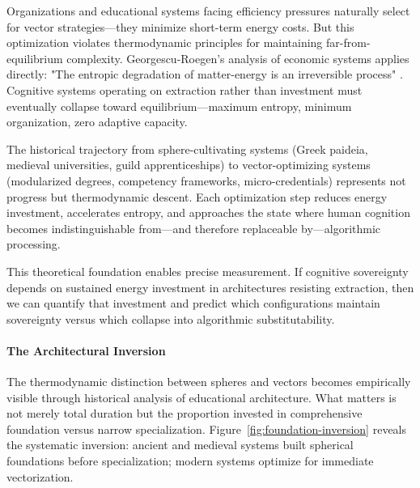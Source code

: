 Organizations and educational systems facing efficiency pressures naturally select for vector strategies—they minimize short-term energy costs. But this optimization violates thermodynamic principles for maintaining far-from-equilibrium complexity. Georgescu-Roegen's analysis of economic systems applies directly: "The entropic degradation of matter-energy is an irreversible process" \citep{georgescu1971}. Cognitive systems operating on extraction rather than investment must eventually collapse toward equilibrium—maximum entropy, minimum organization, zero adaptive capacity.

The historical trajectory from sphere-cultivating systems (Greek paideia, medieval universities, guild apprenticeships) to vector-optimizing systems (modularized degrees, competency frameworks, micro-credentials) represents not progress but thermodynamic descent. Each optimization step reduces energy investment, accelerates entropy, and approaches the state where human cognition becomes indistinguishable from—and therefore replaceable by—algorithmic processing.

This theoretical foundation enables precise measurement. If cognitive sovereignty depends on sustained energy investment in architectures resisting extraction, then we can quantify that investment and predict which configurations maintain sovereignty versus which collapse into algorithmic substitutability.

\paragraph{The Architectural Inversion}

The thermodynamic distinction between spheres and vectors becomes empirically visible through historical analysis of educational architecture. What matters is not merely total duration but the proportion invested in comprehensive foundation versus narrow specialization. Figure~\ref{fig:foundation-inversion} reveals the systematic inversion: ancient and medieval systems built spherical foundations before specialization; modern systems optimize for immediate vectorization.

